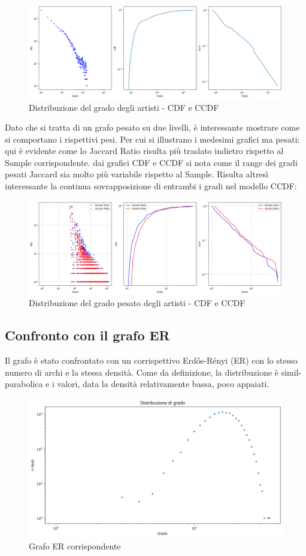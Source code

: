 \documentclass[sigchi]{acmart}
\begin{document}
\begin{figure}[H]
\centering
\includegraphics[width=0.45
\textwidth]{../network_analysis/plots/2_2/plotDist.png}
\caption{Distribuzione del grado degli artisti - CDF e CCDF}
\label{fig:plotDist}
\end{figure}

\noindent Dato che si tratta di un grafo pesato su due livelli, è interessante mostrare come si comportano i rispettivi pesi. Per cui si illustrano i medesimi grafici ma pesati: qui è evidente come lo Jaccard Ratio risulta più traslato indietro rispetto al Sample corrispondente. dai grafici CDF e CCDF si nota come il range dei gradi pesati Jaccard sia molto più variabile rispetto al Sample. Risulta altresì interessante la continua sovrapposizione di entrambi i gradi nel modello CCDF:

\begin{figure}[H]
\centering
\includegraphics[width=0.45
\textwidth]{../network_analysis/plots/2_2/wPlotDist.png}
\caption{Distribuzione del grado pesato degli artisti - CDF e CCDF}
\label{fig:wPlotDist}
\end{figure}

\subsection{Confronto con il grafo ER}

Il grafo è stato confrontato con un corrispettivo Erdős-Rényi (ER) con lo stesso numero di archi e la stessa densità. Come da definizione, la distribuzione è simil-parabolica e i valori, data la densità relativamente bassa, poco appaiati.

\begin{figure}[H]
\centering
\includegraphics[width=0.45
\textwidth]{../network_analysis/plots/2_2/ERGrDist.png}
\caption{Grafo ER corrispondente}
\label{fig:ERGrDist}
\end{figure}
\end{document}
